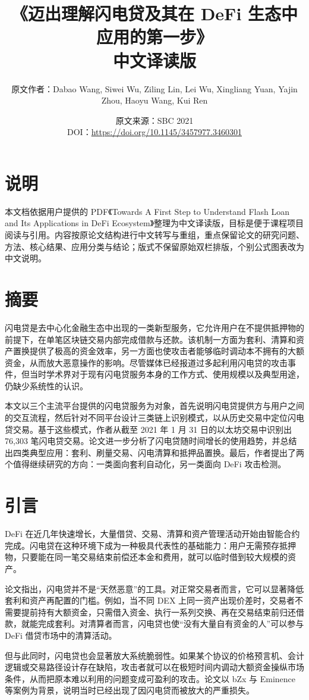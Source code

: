 \documentclass[UTF8,11pt]{ctexart}
\title{《迈出理解闪电贷及其在 DeFi 生态中应用的第一步》\\中文译读版}
\author{原文作者：Dabao Wang, Siwei Wu, Ziling Lin, Lei Wu, Xingliang Yuan, Yajin Zhou, Haoyu Wang, Kui Ren}
\date{原文来源：SBC 2021\\DOI：\url{https://doi.org/10.1145/3457977.3460301}}
\begin{document}
\maketitle

\section*{说明}
本文档依据用户提供的 PDF《Towards A First Step to Understand Flash Loan and Its Applications in DeFi Ecosystem》整理为中文译读版，目标是便于课程项目阅读与引用。内容按原论文结构进行中文转写与重组，重点保留论文的研究问题、方法、核心结果、应用分类与结论；版式不保留原始双栏排版，个别公式图表改为中文说明。

\section*{摘要}
闪电贷是去中心化金融生态中出现的一类新型服务，它允许用户在不提供抵押物的前提下，在单笔区块链交易内部完成借款与还款。该机制一方面为套利、清算和资产置换提供了极高的资金效率，另一方面也使攻击者能够临时调动本不拥有的大额资金，从而放大恶意操作的影响。尽管媒体已经报道过多起利用闪电贷的攻击事件，但当时学术界对于现有闪电贷服务本身的工作方式、使用规模以及典型用途，仍缺少系统性的认识。

本文以三个主流平台提供的闪电贷服务为对象，首先说明闪电贷提供方与用户之间的交互流程，然后针对不同平台设计三类链上识别模式，以从历史交易中定位闪电贷交易。基于这些模式，作者从截至 2021 年 1 月 31 日的以太坊交易中识别出 76,303 笔闪电贷交易。论文进一步分析了闪电贷随时间增长的使用趋势，并总结出四类典型应用：套利、刷量交易、闪电清算和抵押品置换。最后，作者提出了两个值得继续研究的方向：一类面向套利自动化，另一类面向 DeFi 攻击检测。

\section{引言}
DeFi 在近几年快速增长，大量借贷、交易、清算和资产管理活动开始由智能合约完成。闪电贷在这种环境下成为一种极具代表性的基础能力：用户无需预存抵押物，只要能在同一笔交易结束前偿还本金和费用，就可以临时借到较大规模的资产。

论文指出，闪电贷并不是“天然恶意”的工具。对正常交易者而言，它可以显著降低套利和资产再配置的门槛。例如，当不同 DEX 上同一资产出现价差时，交易者不需要提前持有大额资金，只需借入资金、执行一系列交换、再在交易结束前归还借款，就能完成套利。对清算者而言，闪电贷也使“没有大量自有资金的人”可以参与 DeFi 借贷市场中的清算活动。

但与此同时，闪电贷也会显著放大系统脆弱性。如果某个协议的价格预言机、会计逻辑或交易路径设计存在缺陷，攻击者就可以在极短时间内调动大额资金操纵市场条件，从而把原本难以利用的问题变成可盈利的攻击。论文以 bZx 与 Eminence 等案例为背景，说明当时已经出现了因闪电贷而被放大的严重损失。
\end{document}
